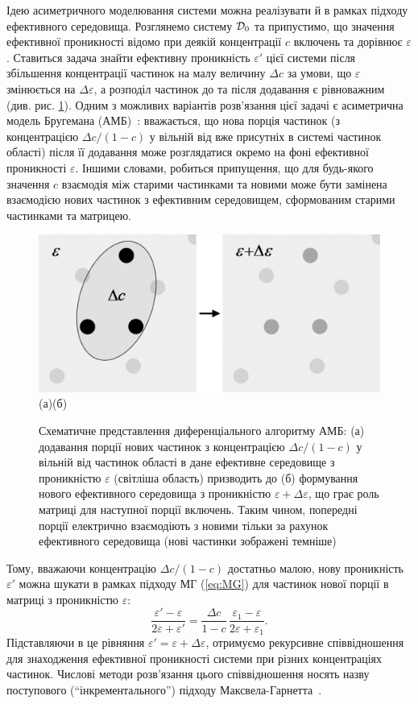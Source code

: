 \documentclass[14pt,twoside]{vakthesis}
\newcommand{\colr}{\color{black}}
\begin{document}
Ідею асиметричного моделювання системи можна реалізувати й в рамках підходу ефективного середовища.
Розглянемо систему ${\cal D}_0$ та припустимо, що значення ефективної проникності відомо при деякій концентрації $c$ включень та дорівнює $\varepsilon$. Ставиться задача знайти ефективну проникність $\varepsilon'$ цієї системи після збільшення концентрації частинок на малу величину $\Delta c$ за умови, що $\varepsilon$ змінюється на $\Delta\varepsilon$, а розподіл частинок до та після додавання є рівноважним (див. рис. \ref{fig:HanaiDiff}).
Одним з можливих варіантів розв'язання цієї задачі є асиметрична модель Бругемана (АМБ)~\cite{Bruggeman1935}: вважається, що нова порція частинок (з концентрацією $\Delta c/(1-c)$ у вільній від вже присутніх в системі частинок області) після її додавання може розглядатися окремо на фоні ефективної проникності $\varepsilon$. 
Іншими словами, робиться припущення, що для будь-якого значення $c$ взаємодія між старими частинками та новими може бути замінена взаємодією нових частинок з ефективним середовищем, сформованим старими частинками та матрицею. 
\begin{figure}[tb]
	\centering
	\includegraphics[height=0.3\textwidth]{HanaiDiff.eps}\\
	(а)\qquad\qquad\qquad\qquad\qquad\qquad(б)
	\caption{\label{fig:HanaiDiff}Схематичне представлення
		диференціального алгоритму АМБ: (а) додавання порції
		нових частинок з концентрацією $\Delta c/(1-c)$ у вільній
		від частинок області в дане ефективне середовище з
		проникністю $\varepsilon$ (світліша область) призводить до
		(б) формування нового ефективного середовища з проникністю
		$\varepsilon + \Delta\varepsilon$, що грає роль матриці для
		наступної порції включень. Таким чином, попередні порції
		електрично взаємодіють з новими тільки за рахунок
		ефективного середовища (нові частинки зображені
		темніш{\colr е})}
\end{figure}
Тому, вважаючи концентрацію $\Delta c/(1-c)$ достатньо малою, нову проникність $\varepsilon'$ можна шукати  в рамках підходу МГ (\ref{eq:MG}) для частинок нової порції в матриці з проникністю $\varepsilon$:
\begin{equation}\label{eq:Hanai-diff-start}
\frac{\varepsilon' - \varepsilon}{2 \varepsilon + \varepsilon'} = \frac{\Delta c}{1 - c}\, \frac{\varepsilon_1 - \varepsilon}{2\varepsilon + \varepsilon_1}. 
\end{equation}
Підставляючи в це рівняння $\varepsilon' = \varepsilon + \Delta\varepsilon$, отримуємо рекурсивне співвідношення для знаходження ефективної проникності системи при різних концентраціях частинок.
Числові методи розв'язання цього співвідношення носять назву поступового (``інкрементального'') підходу Максвела-Гарнетта~\cite{Lakhtakia1998, Michel2001}.
\end{document}
